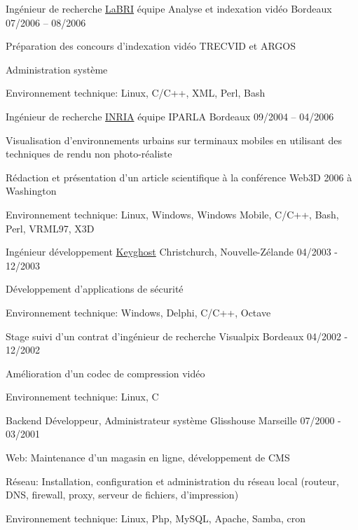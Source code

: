 \begin{cventries}
  \cventry
    {Ingénieur de recherche}
    {\href{https://www.labri.fr/}{LaBRI} équipe Analyse et indexation vidéo}
    {Bordeaux}
    {07/2006 – 08/2006}
    {
      \begin{cvitems}
        \item {Préparation des concours d'indexation vidéo TRECVID et ARGOS}
        \item {Administration système}
        \item {Environnement technique: Linux, C/C++, XML, Perl, Bash}
      \end{cvitems}
    }

  \cventry
    {Ingénieur de recherche}
    {\href{https://www.inria.fr/}{INRIA} équipe IPARLA}
    {Bordeaux}
    {09/2004 – 04/2006}
    {
      \begin{cvitems}
        \item {Visualisation d'environnements urbains sur terminaux mobiles en
            utilisant des techniques de rendu non photo-réaliste}
        \item {Rédaction et présentation d'un article scientifique à la
            conférence Web3D 2006 à Washington}
        \item {Environnement technique: Linux, Windows, Windows Mobile, C/C++,
            Bash, Perl, VRML97, X3D}
      \end{cvitems}
    }

  \cventry
    {Ingénieur développement}
    {\href{https://www.keyghost.com/}{Keyghost}}
    {Christchurch, Nouvelle-Zélande}
    {04/2003 - 12/2003}
    {
      \begin{cvitems}
        \item {Développement d'applications de sécurité}
		\item {Environnement technique: Windows, Delphi, C/C++, Octave}
      \end{cvitems}
    }

  \cventry
    {Stage suivi d'un contrat d'ingénieur de recherche}
    {Visualpix}
    {Bordeaux}
    {04/2002 - 12/2002}
    {
      \begin{cvitems}
        \item {Amélioration d'un codec de compression vidéo}
        \item {Environnement technique: Linux, C}
      \end{cvitems}
    }

  \cventry
    {Backend Développeur, Administrateur système}
    {Glisshouse}
    {Marseille}
    {07/2000 - 03/2001}
    {
      \begin{cvitems}
        \item {Web: Maintenance d'un magasin en ligne, développement de CMS}
        \item {Réseau: Installation, configuration et administration du réseau
            local (routeur, DNS, firewall, proxy, serveur de fichiers,
            d'impression)}
        \item {Environnement technique: Linux, Php, MySQL, Apache, Samba, cron}
      \end{cvitems}
    }

\end{cventries}
